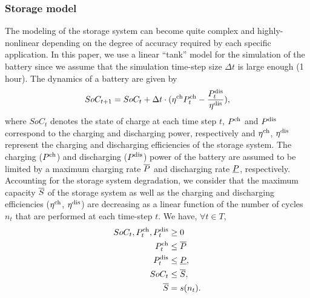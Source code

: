 \documentclass{article}
\begin{document}
\subsubsection{Storage model}
    
    The modeling of the storage system can become quite complex and highly-nonlinear depending on the degree of accuracy required by each specific application. In this paper, we use a linear ``tank'' model for the simulation of the battery since we assume that the simulation time-step size $\Delta t$ is large enough (1 hour). The dynamics of a battery are given by
    \begin{gather}
    SoC_{t+1} = SoC_{t}+ \Delta t\cdot(\eta^{\text{ch}} P^{\text{ch}}_t - \frac{P^{\text{dis}}_t}{\eta^{\text{dis}}}) ,\label{eqn: storagedynamics}
    \end{gather}
    where $SoC_{t}$ denotes the state of charge at each time step $t$, $P^{\text{ch}}$ and $P^{\text{dis}}$ correspond to the charging and discharging power, respectively and $\eta^{\text{ch}}$, $\eta^{\text{dis}}$ represent the charging and discharging efficiencies of the storage system. The charging ($P^{\text{ch}}$) and discharging ($P^{\text{dis}}$) power of the battery are assumed to be limited by a maximum charging rate $\overline{P}$ and discharging rate $\underline{P}$, respectively. Accounting for the storage system degradation, we consider that the maximum capacity $\overline{S}$ of the storage system as well as the charging and discharging efficiencies ($\eta^{\text{ch}}$, $\eta^{\text{dis}}$) are decreasing as a linear function of the number of cycles $n_t$ that are performed at each time-step $t$. We have, $\forall t \in T$, 
    \begin{align}
    SoC_{t}, P^{\text{ch}}_t, P^{\text{dis}}_t &\geq 0 \\
    P^{\text{ch}}_t &\leq \overline{P}\\
    P^{\text{dis}}_t &\leq \underline{P} , \\
    SoC_{t} &\leq \overline{S} \label{eqn: storage limits},\\
    \overline{S}&=s(n_t). \label{eqn: storage_limits_evolving}
    \end{align}
    
\end{document}
